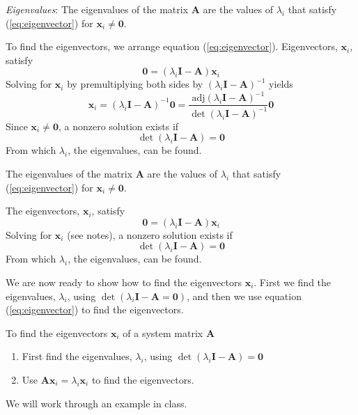 \emph{Eigenvalues}: The eigenvalues of the matrix $\mathbf{A}$ are the values of $\lambda_i$ that satisfy (\ref{eq:eigenvector}) for $\mathbf{x}_i\ne \mathbf{0}$.

To find the eigenvectors, we arrange equation (\ref{eq:eigenvector}). Eigenvectors, $\mathbf{x}_i$, satisfy
\begin{equation}\label{eq:581}
	\mathbf{0}=(\lambda_i\mathbf{I}-\mathbf{A})\mathbf{x}_i
\end{equation}
Solving for $\mathbf{x}_i$ by premultiplying both sides by $(\lambda_i\mathbf{I}-\mathbf{A})^{-1}$ yields
\[
	\mathbf{x}_i = (\lambda_i\mathbf{I}-\mathbf{A})^{-1}\mathbf{0} =
	       \frac{\textrm{adj}(\lambda_i\mathbf{I}-\mathbf{A})^{-1}}{\det(\lambda_i\mathbf{I}-\mathbf{A})^{-1}}\mathbf{0}
\]
Since $\mathbf{x}_i\ne \mathbf{0}$, a nonzero solution exists if
\begin{equation}\label{eq:eigenvalue}
	\det(\lambda_i\mathbf{I}-\mathbf{A}) = \mathbf{0} \label{eq:eigenvalue}
\end{equation}
From which $\lambda_i$, the eigenvalues, can be found.
\ifslidesonly
\begin{slide}
The eigenvalues of the matrix $\mathbf{A}$ are the values of $\lambda_i$ that satisfy (\ref{eq:eigenvector}) for $\mathbf{x}_i\ne \mathbf{0}$.

The eigenvectors, $\mathbf{x}_i$, satisfy
\begin{equation}
	\mathbf{0}=(\lambda_i\mathbf{I}-\mathbf{A})\mathbf{x}_i \label{eq:581}
\end{equation}
Solving for $\mathbf{x}_i$ (see notes), a nonzero solution exists if
\begin{equation}\label{eq:eigenvalue}
	\det(\lambda_i\mathbf{I}-\mathbf{A}) = \mathbf{0} \label{eq:eigenvalue}
\end{equation}
From which $\lambda_i$, the eigenvalues, can be found.
\end{slide}
\fi

We are now ready to show how to find the eigenvectors $\mathbf{x}_i$.
First we find the eigenvalues, $\lambda_i$, using
$\det(\lambda_i\mathbf{I}-\mathbf{A} = \mathbf{0})$, and then we
use equation (\ref{eq:eigenvector}) to find the eigenvectors.

\ifslidesonly
\begin{slide}
   To find the eigenvectors $\mathbf{x}_i$ of a system matrix $\mathbf{A}$
\begin{enumerate}
   	\item First find the eigenvalues, $\lambda_i$, using $\det(\lambda_i\mathbf{I}-\mathbf{A}) = \mathbf{0}$
   	\item Use $\mathbf{A}\mathbf{x}_i=\lambda_i\mathbf{x}_i$ to find the eigenvectors.
   \end{enumerate}
   We will work through an example in class.
\end{slide}
\fi

